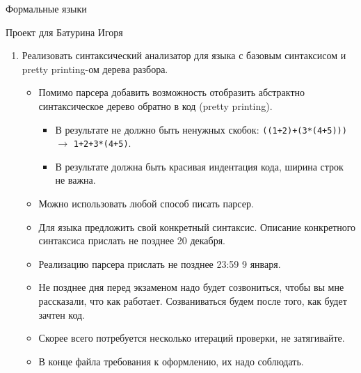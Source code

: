 \documentclass[12pt]{article}
\begin{document}
\begin{center}
{\LARGE Формальные языки}

{\Large Проект для Батурина Игоря}

\end{center}

\bigskip

\begin{enumerate}
  \item {Реализовать синтаксический анализатор для языка с базовым синтаксисом и pretty printing-ом дерева разбора. }
  \begin{itemize}
    \item Помимо парсера добавить возможность отобразить абстрактно синтаксическое дерево обратно в код (pretty printing).
    \begin{itemize}
      \item В результате не должно быть ненужных скобок: \verb!((1+2)+(3*(4+5)))! $\to$ \verb!1+2+3*(4+5)!.
      \item В результате должна быть красивая индентация кода, ширина строк не важна.
    \end{itemize}
    \item Можно использовать любой способ писать парсер.
    \item Для языка предложить свой конкретный синтаксис. Описание конкретного синтаксиса прислать не позднее 20 декабря.
    \item Реализацию парсера прислать не позднее 23:59 9 января.
    \item Не позднее дня перед экзаменом надо будет созвониться, чтобы вы мне рассказали, что как работает. Созваниваться будем после того, как будет зачтен код.
    \item Скорее всего потребуется несколько итераций проверки, не затягивайте.
    \item В конце файла требования к оформлению, их надо соблюдать.
  \end{itemize}

\end{enumerate}



\bigskip


\end{document}
